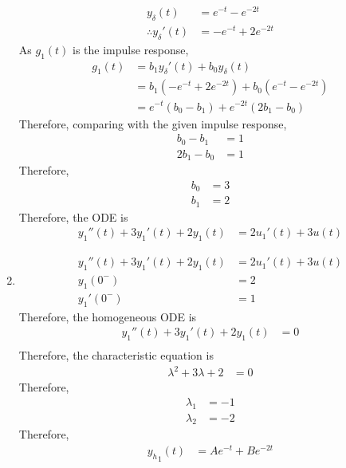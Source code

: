 \documentclass[fleqn, a4paper, 11pt, oneside]{amsart}
\theoremstyle{definition}
\theoremstyle{theorem}
\begin{document}
\begin{solution}
\begin{enumerate}[leftmargin=*]
\begin{align*}
				y_{\delta}(t)               & = e^{-t} - e^{-2 t} \\
				\therefore {y_{\delta}}'(t) & = -e^{-t} + 2 e^{-2 t}
			\end{align*}
			As $g_1(t)$ is the impulse response,
			\begin{align*}
				g_1(t) & = b_1 {y_{\delta}}'(t) + b_0 y_{\delta}(t)                                       \\
                                       & = b_1 \left( -e^{-t} + 2 e^{-2 t} \right) + b_0 \left( e^{-t} - e^{-2 t} \right) \\
                                       & = e^{-t} (b_0 - b_1) + e^{-2 t} (2 b_1 - b_0)
			\end{align*}
			Therefore, comparing with the given impulse response,
			\begin{align*}
				b_0 - b_1   & = 1 \\
				2 b_1 - b_0 & = 1
			\end{align*}
			Therefore,
			\begin{align*}
				b_0 & = 3 \\
				b_1 & = 2
			\end{align*}
			Therefore, the ODE is
			\begin{align*}
				{y_1}''(t) + 3 {y_1}'(t) + 2 y_1(t) & = 2 {u_1}'(t) + 3 u(t)
			\end{align*}
		\item
			\begin{align*}
				{y_1}''(t) + 3 {y_1}'(t) + 2 y_1(t) & = 2 {u_1}'(t) + 3 u(t) \\
				y_1(0^-)                            & = 2                    \\
				{y_1}'(0^-)                         & = 1
			\end{align*}
			Therefore, the homogeneous ODE is
			\begin{align*}
				{y_1}''(t) + 3 {y_1}'(t) + 2 y_1(t) & = 0 \\
			\end{align*}
			Therefore, the characteristic equation is
			\begin{align*}
				\lambda^2 + 3 \lambda + 2 & = 0
			\end{align*}
			Therefore,
			\begin{align*}
				\lambda_1 & = -1 \\
				\lambda_2 & = -2
			\end{align*}
			Therefore,
			\begin{align*}
				{y_h}_1(t)               & = A e^{-t} + B e^{-2 t} \\

\end{align*}
\end{enumerate}
\end{solution}
\end{document}
